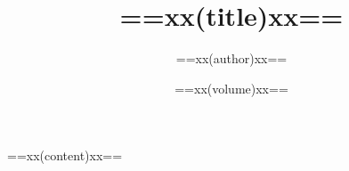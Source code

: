 \documentclass[normal, black]{qiushi}
\title{==xx(title)xx==}
\author{==xx(author)xx==}
\date{==xx(volume)xx==}
\begin{document}
    \maketitle

    ==xx(content)xx==
\end{document}

